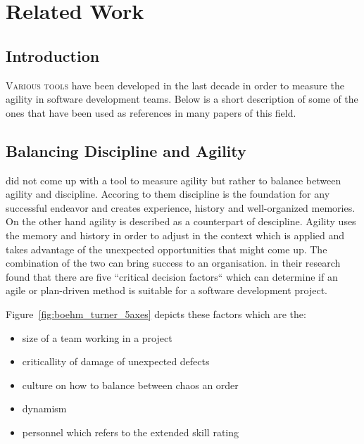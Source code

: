 \chapter{Related Work}\label{ch:related_work}

\section{Introduction}
\lettrine[lines=4, loversize=-0.1, lraise=0.1]{V}{arious tools} have been developed in the last decade in order to measure the agility in software development teams. Below is a short description of some of the ones that have been used as references in many papers of this field.

\section{Balancing Discipline and Agility}

\citet{1231450} did not come up with a tool to measure agility but rather to balance between agility and discipline. Accoring to them \cite{1317503} discipline is the foundation for any successful endeavor and creates experience, history and well-organized memories. On the other hand agility is described as a counterpart of descipline. Agility uses the memory and history in order to adjust in the context which is applied and takes advantage of the unexpected opportunities that might come up. The combination of the two can bring success to an organisation. 
\citet{1231450} in their research found that there are five ``critical decision factors`` which can determine if an agile or plan-driven method is suitable for a software development project.

Figure~\ref{fig:boehm_turner_5axes} depicts these factors which are the:

\begin{itemize}
\item size of a team working in a project
\item criticallity of damage of unexpected defects %
\item culture on how to balance between chaos an order %
\item dynamism %
\item personnel which refers to the extended \citet{cockburn2002agile} skill rating %
\end{itemize}


